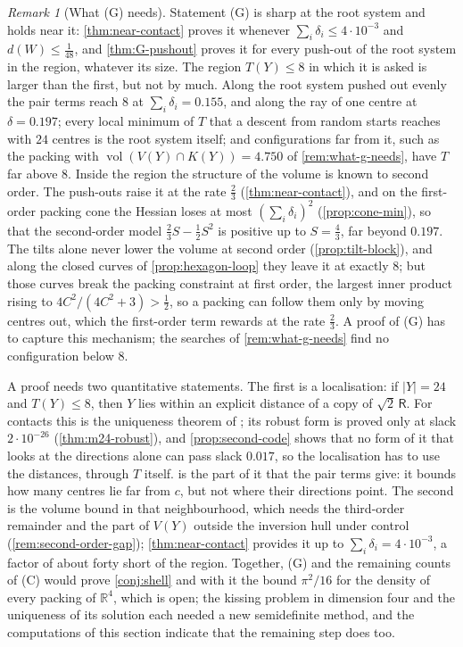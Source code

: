 \documentclass[11pt,reqno]{amsart}
\renewcommand{\_}{\origunderscore\allowbreak}
\numberwithin{equation}{section}
\theoremstyle{plain}
\theoremstyle{definition}
\theoremstyle{remark}
\newtheorem{remark}[thm]{Remark}
\newcommand{\Rt}{\mathsf{R}}                 %
\DeclareMathOperator{\vol}{vol}
\begin{document}
\begin{remark}[What (G) needs]\label{rem:what-g-needs-2}
Statement (G) is sharp at the root system and holds near it:
\cref{thm:near-contact} proves it whenever $\sum_i\delta_i\le4\cdot10^{-3}$
and $d(W)\le\frac1{48}$, and \cref{thm:G-pushout} proves it for every
push-out of the root system in the region, whatever its size. The region
$T(Y)\le8$ in which it is asked is larger than the first, but not by much. Along the root system pushed out evenly the pair
terms reach $8$ at $\sum_i\delta_i=0.155$, and along the ray of one centre
at $\delta=0.197$; every local minimum of $T$ that a descent from random
starts reaches with $24$ centres is the root system itself; and
configurations far from it, such as the packing with
$\vol(V(Y)\cap K(Y))=4.750$ of \cref{rem:what-g-needs}, have $T$ far above $8$.
Inside the region the structure of the volume is known to second order. The
push-outs raise it at the rate $\frac23$ (\cref{thm:near-contact}), and on
the first-order packing cone the Hessian loses at most
$(\sum_i\delta_i)^2$ (\cref{prop:cone-min}), so that the second-order model
$\frac23S-\frac12S^2$ is positive up to $S=\frac43$, far beyond $0.197$. The
tilts alone never lower the volume at second order (\cref{prop:tilt-block}),
and along the closed curves of \cref{prop:hexagon-loop} they leave it at
exactly $8$; but those curves break the packing constraint at first order,
the largest inner product rising to $4C^2/(4C^2+3)>\frac12$, so a packing can
follow them only by moving centres out, which the first-order term rewards
at the rate $\frac23$. A proof of (G) has to capture this mechanism; the
searches of \cref{rem:what-g-needs} find no configuration below $8$.

A proof needs two quantitative statements. The first is a localisation: if
$|Y|=24$ and $T(Y)\le8$, then $Y$ lies within an explicit distance of a copy
of $\sqrt2\,\Rt$. For contacts this is the uniqueness theorem of
\cite{LLM24}; its robust form is proved only at slack $2\cdot10^{-26}$
(\cref{thm:m24-robust}), and \cref{prop:second-code} shows that no form of it
that looks at the directions alone can pass slack $0.017$, so the
localisation has to use the distances, through $T$ itself.
 is the part of it that the pair terms give: it bounds
how many centres lie far from $c$, but not where their directions point. The second is the
volume bound in that neighbourhood, which needs the third-order remainder
and the part of $V(Y)$ outside the inversion hull under control
(\cref{rem:second-order-gap}); \cref{thm:near-contact} provides it up to
$\sum_i\delta_i=4\cdot10^{-3}$, a factor of about forty short of the region.
Together, (G) and the remaining counts of (C) would prove
\cref{conj:shell} and with it the bound $\pi^2/16$ for the density of every
packing of $\mathbb{R}^4$, which is open; the kissing problem in dimension
four \cite{Mus08} and the uniqueness of its solution \cite{LLM24} each needed
a new semidefinite method, and the computations of this section indicate
that the remaining step does too.
\end{remark}
\end{document}

